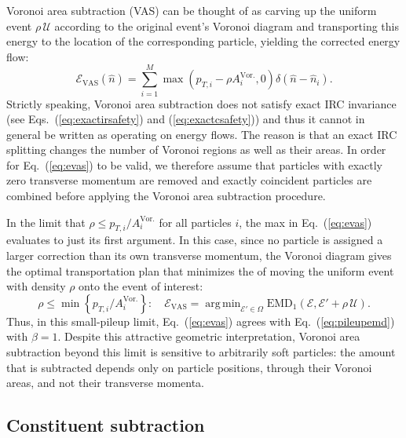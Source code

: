 \documentclass[letterpaper,11pt]{article}
\DeclareMathOperator*{\argmin}{arg\,min}
\newcommand{\E}{\mathcal{E}}
\DeclareRobustCommand{\Eq}[1]{Eq.~(\ref{#1})}
\DeclareRobustCommand{\Eqs}[2]{Eqs.~(\ref{#1}) and (\ref{#2})}
\newcommand{\EMD}{\text{EMD}\xspace}
\begin{document}
Voronoi area subtraction (VAS) can be thought of as carving up the uniform event $\rho\,\mathcal U$ according to the original event's Voronoi diagram and transporting this energy to the location of the corresponding particle, yielding the corrected energy flow:%
%
\begin{equation}
\label{eq:evas}
\E_\text{VAS}(\hat n)=\sum_{i=1}^M\max\left(p_{T,i}-\rho A_i^\text{Vor.},0\right)\delta(\hat n - \hat n_i).
\end{equation}
%
Strictly speaking, Voronoi area subtraction does not satisfy exact IRC invariance (see \Eqs{eq:exactirsafety}{eq:exactcsafety}) and thus it cannot in general be written as operating on energy flows.
%
The reason is that an exact IRC splitting changes the number of Voronoi regions as well as their areas.
%
In order for \Eq{eq:evas} to be valid, we therefore assume that particles with exactly zero transverse momentum are removed and exactly coincident particles are combined before applying the Voronoi area subtraction procedure.


In the limit that $\rho\le p_{T,i}/A_i^\text{Vor.}$ for all particles $i$, the max in \Eq{eq:evas} evaluates to just its first argument.
%
In this case, since no particle is assigned a larger correction than its own transverse momentum, the Voronoi diagram gives the optimal transportation plan that minimizes the \EMD of moving the uniform event with density $\rho$ onto the event of interest:
%
\begin{equation}\label{eq:evas2}
\boxed{
\rho \le \min\left\{p_{T,i}/A_i^\text{Vor.}\right\}: \quad \mathcal E_\text{VAS} = \argmin_{\mathcal E' \in \Omega} \EMD_1(\mathcal E, \mathcal E' + \rho\,\mathcal U).
}
\end{equation}
%
Thus, in this small-pileup limit, \Eq{eq:evas} agrees with \Eq{eq:pileupemd} with $\beta=1$.
%
Despite this attractive geometric interpretation, Voronoi area subtraction beyond this limit is sensitive to arbitrarily soft particles: the amount that is subtracted depends only on particle positions, through their Voronoi areas, and not their transverse momenta.


\subsection{Constituent subtraction}
\label{subsec:const_sub}
\end{document}
